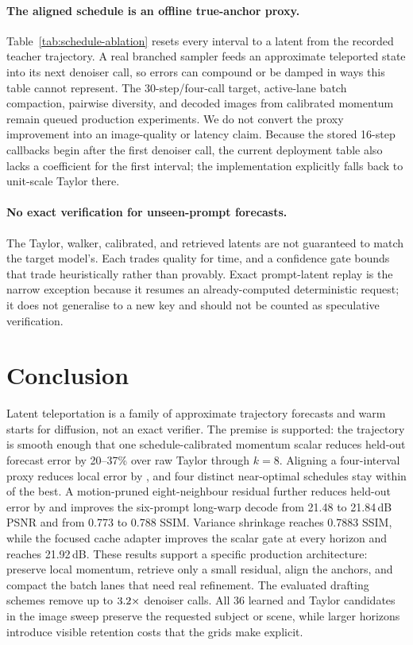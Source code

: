 \documentclass[11pt,a4paper]{article}
\begin{document}
\paragraph{The aligned schedule is an offline true-anchor proxy.}
Table~\ref{tab:schedule-ablation} resets every interval to a latent from the
recorded teacher trajectory. A real branched sampler feeds an approximate
teleported state into its next denoiser call, so errors can compound or be
damped in ways this table cannot represent. The 30-step/four-call target,
active-lane batch compaction, pairwise diversity, and decoded images from
calibrated momentum remain queued production experiments. We do not convert the
proxy improvement into an image-quality or latency claim. Because the stored
16-step callbacks begin after the first denoiser call, the current deployment
table also lacks a coefficient for the first interval; the implementation
explicitly falls back to unit-scale Taylor there.

\paragraph{No exact verification for unseen-prompt forecasts.} The Taylor,
walker, calibrated, and retrieved latents are not guaranteed to match the target
model's. Each trades quality for time, and a confidence gate bounds that trade
heuristically rather than provably. Exact prompt-latent replay is the narrow
exception because it resumes an already-computed deterministic request; it
does not generalise to a new key and should not be counted as speculative
verification.

\section{Conclusion}

Latent teleportation is a family of approximate trajectory forecasts and warm
starts for diffusion, not an exact verifier. The premise is supported: the
trajectory is smooth enough that one schedule-calibrated momentum scalar reduces
held-out forecast error by 20--37\% over raw Taylor through $k=8$. Aligning a
four-interval proxy reduces local error by \AlignedFourImprovement{}, and four
distinct near-optimal schedules stay within \StaggeredGap{} of the best. A
motion-pruned eight-neighbour residual further reduces held-out error by
\RetrievalBestGain{} and improves the six-prompt long-warp decode from
21.48 to 21.84\,dB PSNR and from 0.773 to 0.788 SSIM. Variance shrinkage reaches
0.7883 SSIM, while the focused cache adapter improves the scalar gate at every
horizon and reaches 21.92\,dB. These results support a
specific production architecture: preserve local momentum, retrieve only a
small residual, align the anchors, and compact the batch lanes that need real
refinement. The evaluated drafting
schemes remove up to $3.2\times$ denoiser calls. All 36 learned
and Taylor candidates in the image sweep preserve the requested subject or
scene, while larger horizons introduce visible retention costs that the grids
make explicit.
\end{document}
